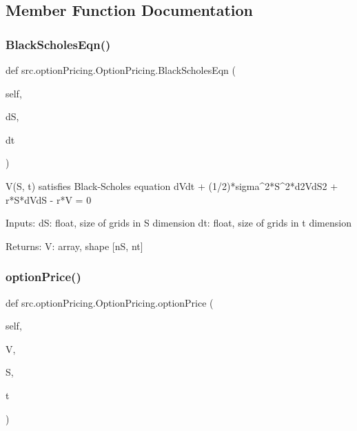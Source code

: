 \subsection{Member Function Documentation}
\mbox{\label{classsrc_1_1optionPricing_1_1OptionPricing_a5ee60e0ef4ec623ffca945b42d21c567}} 
\subsubsection{\texorpdfstring{Black\+Scholes\+Eqn()}{BlackScholesEqn()}}
{\footnotesize\ttfamily def src.\+option\+Pricing.\+Option\+Pricing.\+Black\+Scholes\+Eqn (\begin{DoxyParamCaption}\item[{}]{self,  }\item[{}]{dS,  }\item[{}]{dt }\end{DoxyParamCaption})}

\begin{DoxyVerb}V(S, t) satisfies Black-Scholes equation
dVdt + (1/2)*sigma^2*S^2*d2VdS2 + r*S*dVdS - r*V = 0

Inputs:
dS: float, size of grids in S dimension
dt: float, size of grids in t dimension

Returns:
V: array, shape [nS, nt]
\end{DoxyVerb}
 \mbox{\label{classsrc_1_1optionPricing_1_1OptionPricing_affc466184874e04ddc6deae50c50e8eb}} 
\subsubsection{\texorpdfstring{option\+Price()}{optionPrice()}}
{\footnotesize\ttfamily def src.\+option\+Pricing.\+Option\+Pricing.\+option\+Price (\begin{DoxyParamCaption}\item[{}]{self,  }\item[{}]{V,  }\item[{}]{S,  }\item[{}]{t }\end{DoxyParamCaption})}

